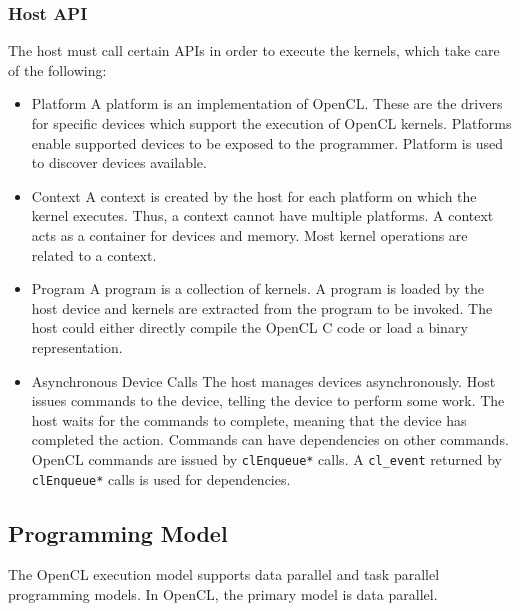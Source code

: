 \subsubsection{Host API}
\label{sect4_1_3_2}
The host must call certain APIs in order to execute the kernels, which take care of the following:
\begin{itemize}
\item Platform \newline
A platform is an implementation of OpenCL. These are the drivers for specific devices which support the execution of OpenCL kernels. Platforms enable supported devices to be exposed to the programmer. Platform is used to discover devices available.
\item Context \newline
A context is created by the host for each platform on which the kernel executes. Thus, a context cannot have multiple platforms. A context acts as a container for devices and memory. Most kernel operations are related to a context.
\item Program \newline
A program is a collection of kernels. A program is loaded by the host device and kernels are extracted from the program to be invoked. The host could either directly compile the OpenCL C code or load a binary representation.
\item Asynchronous Device Calls \newline
The host manages devices asynchronously. Host issues commands to the device, telling the device to perform some work. The host waits for the commands to complete, meaning that the device has completed the action. Commands can have dependencies on other commands. OpenCL commands are issued by \verb|clEnqueue*| calls. A \verb|cl_event| returned by \verb|clEnqueue*| calls is used for dependencies.

\end{itemize}

 \subsection{Programming Model}
 \label{sect4_1_4}
The OpenCL execution model supports data parallel and task parallel programming models. In OpenCL, the primary model is data parallel. \newline

